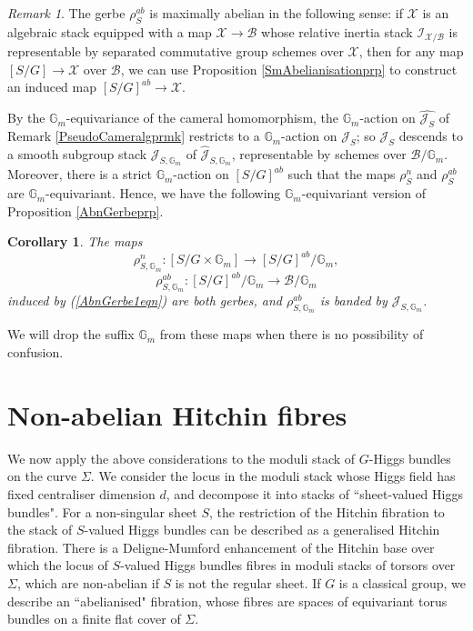 \documentclass{amsart}
\newtheorem{corollary}[theorem]{Corollary}
\theoremstyle{remark}
\newtheorem{remark}[theorem]{Remark}
\numberwithin{theorem}{section}
\numberwithin{equation}{section}
\begin{document}
\begin{remark}\label{AbnGerbermk}
    The gerbe $\rho_S^{ab}$ is maximally abelian in the following sense: if $\mathcal X$ is an algebraic stack equipped with a map $\mathcal X \rightarrow \mathcal B$ whose relative inertia stack $\mathcal I_{\mathcal X/\mathcal B}$ is representable by separated commutative group schemes over $\mathcal X$, then for any map $[S/G] \rightarrow \mathcal X$ over $\mathcal B$, we can use Proposition \ref{SmAbelianisationprp} to construct an induced map $[S/G]^{ab} \rightarrow \mathcal X$.
\end{remark}

By the $\mathbb{G}_m$-equivariance of the cameral homomorphism, the $\mathbb{G}_m$-action on $\hat{\mathcal J_S}$ of Remark \ref{PseudoCameralgprmk} restricts to a $\mathbb{G}_m$-action on $\mathcal J_S$; so $\mathcal J_S$ descends to a smooth subgroup stack $\mathcal J_{S, \mathbb{G}_m}$ of $\hat{\mathcal J}_{S, \mathbb{G}_m}$, representable by schemes over $\mathcal B/\mathbb{G}_m$. Moreover, there is a strict $\mathbb{G}_m$-action on $[S/G]^{ab}$ such that the maps $\rho_S^n$ and $\rho_S^{ab}$ are $\mathbb{G}_m$-equivariant. Hence, we have the following $\mathbb{G}_m$-equivariant version of Proposition \ref{AbnGerbeprp}. 

\begin{corollary}\label{GmEquivAbnGerbecor}
    The maps
    $$\rho_{S,\mathbb{G}_m}^n:[S/G\times\mathbb{G}_m] \rightarrow [S/G]^{ab}/\mathbb{G}_m,$$
    $$\rho_{S,\mathbb{G}_m}^{ab}:[S/G]^{ab}/\mathbb{G}_m \rightarrow \mathcal B/\mathbb{G}_m$$
    induced by (\ref{AbnGerbe1eqn}) are both gerbes, and $\rho_{S,\mathbb{G}_m}^{ab}$ is banded by $\mathcal J_{S, \mathbb{G}_m}$.
\end{corollary}

We will drop the suffix $\mathbb{G}_m$ from these maps when there is no possibility of confusion.

\section{Non-abelian Hitchin fibres}\label{NonabnHitchinscn}
We now apply the above considerations to the moduli stack of $G$-Higgs bundles on the curve $\Sigma$. We consider the locus in the moduli stack whose Higgs field has fixed centraliser dimension $d$, and decompose it into stacks of ``sheet-valued Higgs bundles". For a non-singular sheet $S$, the restriction of the Hitchin fibration to the stack of $S$-valued Higgs bundles can be described as a generalised Hitchin fibration. There is a Deligne-Mumford enhancement of the Hitchin base over which the locus of $S$-valued Higgs bundles fibres in moduli stacks of torsors over $\Sigma$, which are non-abelian if $S$ is not the regular sheet. If $G$ is a classical group, we describe an ``abelianised" fibration, whose fibres are spaces of equivariant torus bundles on a finite flat cover of $\Sigma$. 
\end{document}

